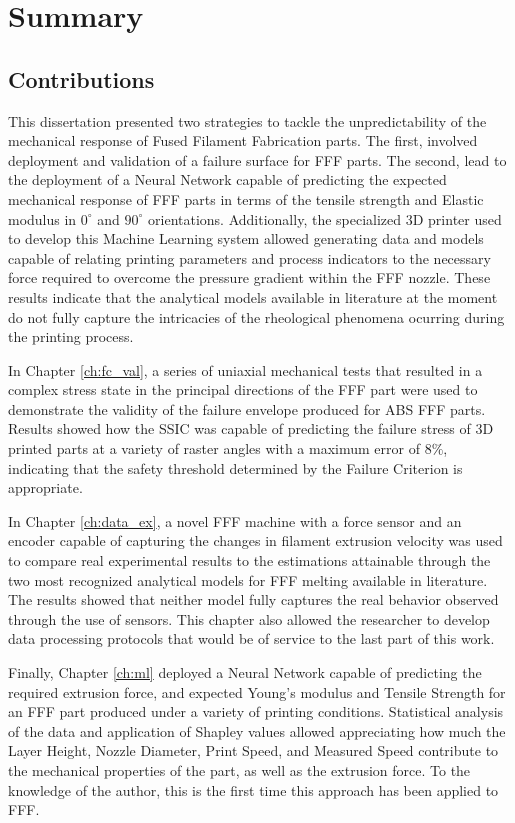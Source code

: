 \documentclass[main.tex]{subfiles}
\begin{document}
\chapter{Summary}\label{ch:summary}
	 
\section{Contributions}
This dissertation presented two strategies to tackle the unpredictability of the mechanical response of Fused Filament Fabrication parts. The first, involved deployment and validation of a failure surface for FFF parts. The second, lead to the deployment of a Neural Network capable of predicting the expected mechanical response of FFF parts in terms of the tensile strength and Elastic modulus in $0^{\circ}$ and $90^{\circ}$ orientations. Additionally, the specialized 3D printer used to develop this Machine Learning system allowed generating data and models capable of relating printing parameters and process indicators to the necessary force required to overcome the pressure gradient within the FFF nozzle. These results indicate that the analytical models available in literature at the moment do not fully capture the intricacies of the rheological phenomena ocurring during the printing process. 

In Chapter \ref{ch:fc_val}, a series of uniaxial mechanical tests that resulted in a complex stress state in the principal directions of the FFF part were used to demonstrate the validity of the failure envelope produced for ABS FFF parts. Results showed how the SSIC was capable of predicting the failure stress of 3D printed parts at a variety of raster angles with a maximum error of $8\%$, indicating that the safety threshold determined by the Failure Criterion is appropriate.

In Chapter \ref{ch:data_ex}, a novel FFF machine with a force sensor and an encoder capable of capturing the changes in filament extrusion velocity was used to compare real experimental results to the estimations attainable through the two most recognized analytical models for FFF melting available in literature. The results showed that neither model fully captures the real behavior observed through the use of sensors. This chapter also allowed the researcher to develop data processing protocols that would be of service to the last part of this work.

Finally, Chapter \ref{ch:ml} deployed a Neural Network capable of predicting the required extrusion force, and expected Young's modulus and Tensile Strength for an FFF part produced under a variety of printing conditions. Statistical analysis of the data and application of Shapley values allowed appreciating how much the Layer Height, Nozzle Diameter, Print Speed, and Measured Speed contribute to the mechanical properties of the part, as well as the extrusion force. To the knowledge of the author, this is the first time this approach has been applied to FFF.
\end{document}
